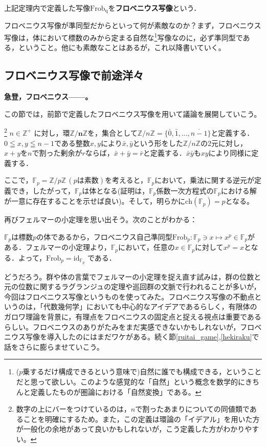 \begin{dfn}[フロベニウス写像]\label{frob_def}
    上記定理内で定義した写像$\mathrm{Frob_q}$を\textbf{フロベニウス写像}という．
\end{dfn}

フロベニウス写像が準同型だからといって何が素敵なのか？まず，フロベニウス写像は，体において標数のみから定まる自然な\footnote{($p$乗するだけ構成できるという意味で)自然に誰でも構成できる，ということだと思って欲しい。このような感覚的な「自然」という概念を数学的にきちんと定義したものが圏論における「自然変換」である。}写像なのに，必ず準同型である，ということ。他にも素敵なことはあるが，これ以降書いていく。

\subsection{フロベニウス写像で前途洋々}
\textbf{急登，フロベニウス------。}

\vspace{10pt}

この節では，前節で定義したフロベニウス写像を用いて議論を展開していこう。

\begin{dfn}\footnote{数字の上にバーをつけているのは，$n$で割ったあまりについての同値類であることを明確にするため。また，この定義は環論の「イデアル」を用いた方が一般化の余地があって良いかもしれないが，こう定義した方がわかりやすい。}
    $n \in \mathbb{Z^{+}}$ に対し，環$\boldsymbol{ \mathbb{Z} /n \mathbb{Z}}$を，集合として$\mathbb{Z} /n \mathbb{Z} = \{\bar{0},\bar{1}, \dots ,\overline{n-1} \}$と定義する．$0\leqq x,y \leqq n-1$である整数$x,y$により$\bar{x},\bar{y}$という形をした$\mathbb{Z}/n\mathbb{Z}$の2元に対し，$x+y$を$n$で割った剰余が$r$ならば，$\bar{x}+\bar{y}=\bar{r}$と定義する．$\bar{x}\bar{y}$も$xy$により同様に定義する．
\end{dfn}

ここで，$\mathbb{F}_p=\mathbb{Z}/p\mathbb{Z} \,(pは素数)$を考えると，$\mathbb{F}_p$において，乗法に関する逆元が定義でき，したがって，$\mathbb{F}_p$は体となる(証明は，$\mathbb{F}_p$係数一次方程式の$\mathbb{F}_p$における解が一意に存在することを示せば良い)。そして，明らかに$\mathrm{ch}(\mathbb{F}_p)=p$となる。

再びフェルマーの小定理を思い出そう。次のことがわかる：

\begin{mybox}[フロベニウス写像の不動点]
    $\mathbb{F}_p$は標数$p$の体であるから，フロベニウス自己準同型$\mathrm{Frob}_p:\mathbb{F}_p\ni x\mapsto x^p\in \mathbb{F}_p$がある．フェルマーの小定理より，$\mathbb{F}_p$において，任意の$x\in \mathbb{F}_p$に対して$x^p=x$となる．よって，$\mathrm{Frob}_p=\mathrm{id}_{\mathbb{F}_p}$ である．
\end{mybox}
どうだろう。群や体の言葉でフェルマーの小定理を捉え直す試みは，群の位数と元の位数に関するラグランジュの定理や巡回群の文脈で行われることが多いが，今回はフロベニウス写像というものを使ってみた。フロベニウス写像の不動点というのは，「代数幾何学」においても中心的なアイデアであるらしく，有限体のガロワ理論を背景に，有理点をフロベニウスの固定点と捉える視点は重要であるらしい。フロベニウスのありがたみをまだ実感できないかもしれないが，フロベニウス写像を導入したのにはまだワケがある。続く節\ref{ruitai_game},\ref{hekiraku}で話をさらに膨らませていこう。